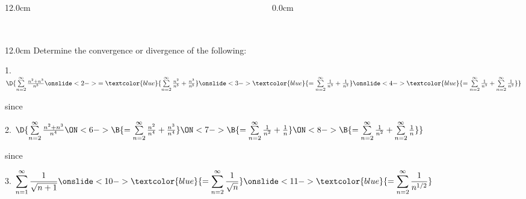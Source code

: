 \begin{frame}
\begin{columns}
\begin{column}{12.0cm}
\end{column}
\begin{column}{0.0cm}\end{column}
\end{columns}
\end{frame}

\begin{frame}
\frametitle{}
\scriptsize

\vspace{0.2cm}

\begin{columns}
\begin{column}{12.0cm}
Determine the convergence or divergence of the following:\\
\vspace{0.2cm}

1. \quad$\D{\sum \limits_{n=2}^{\infty} \frac{n^2 + n^3}{n^5}  \onslide<2->{= \textcolor{blue}{\sum \limits_{n=2}^{\infty} \frac{n^2}{n^5} + \frac{n^3}{n^5}}} \onslide<3->{\textcolor{blue}{= \sum \limits_{n=2}^{\infty} \frac{1}{n^3} + \frac{1}{n^2}}} \onslide<4->{\textcolor{blue}{= \sum \limits_{n=2}^{\infty} \frac{1}{n^3} + \sum \limits_{n=2}^{\infty} \frac{1}{n^2}}}}$

\vspace{0.5cm}

since 

\vspace{0.9cm}

2. \quad$\D{\sum \limits_{n=2}^{\infty} \frac{n^2 + n^3}{n^{4}} 
\ON<6->{\B{= \sum \limits_{n=2}^{\infty} \frac{n^2}{n^4} + \frac{n^3}{n^4}} 
\ON<7->{\B{= \sum \limits_{n=2}^{\infty} \frac{1}{n^2} + \frac{1}{n}}} 
\ON<8->{\B{= \sum \limits_{n=2}^{\infty} \frac{1}{n^2} + \sum \limits_{n=2}^{\infty} \frac{1}{n}}}}}$

\vspace{0.5cm}

since 

\vspace{0.9cm}

3. \quad$\displaystyle{\sum \limits_{n=1}^{\infty} \frac{1}{\sqrt{n+1}} \onslide<10->{\textcolor{blue}{= \sum \limits_{n=2}^{\infty} \frac{1}{\sqrt{n}}}} \onslide<11->{\textcolor{blue}{= \sum \limits_{n=2}^{\infty} \frac{1}{n^{1/2}}}}}$


\end{column}
\end{columns}
\end{frame}
